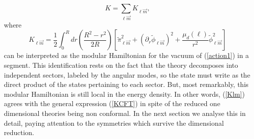 \documentclass[12pt,a4paper]{article}
\begin{document}
\begin{equation}
K=\sum_{\ell \vec{m}}K_{\ell\vec{m}},
\end{equation}
where
\begin{equation}\label{Klm}
K_{\ell\vec{m}}=\frac{1}{2}\int_0^R dr  \left(\frac{R^2-r^2}{2 R}\right)\left[ \widetilde{\pi}_{\ell \vec{m}}^2+ (\partial_r \widetilde{\phi}_{\ell \vec{m}})^2+\frac{\mu_d(\ell)}{r^2} \widetilde{\phi}_{\ell \vec{m}} ^2\right]
\end{equation}
can be interpreted as the modular Hamiltonian for the vacuum of (\ref{action1}) in a segment. This identification rests on the fact that the theory decomposes into independent sectors, labeled by the angular modes, so the state must write as the direct product of the states pertaining to each sector. But, most remarkably, this modular Hamiltonian is still local in the energy density. In other words, (\ref{Klm}) agrees with the general expression (\ref{KCFT}) in spite of the reduced one dimensional theories being non conformal. In the next section we analyse this in detail, paying attention to the symmetries which survive the dimensional reduction.
\end{document}
